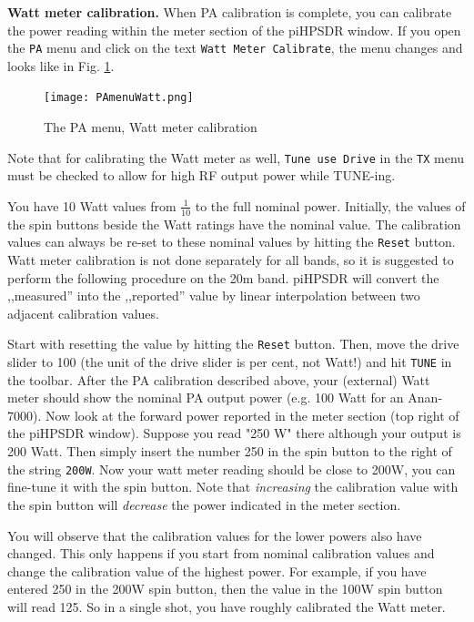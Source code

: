 \documentclass[12pt]{book}
\def\rett#1{\texttt{\color{red}#1}}
\def\bltt#1{\texttt{\color{blue}#1}}
\def\pH{pi\-HPSDR\xspace}
\begin{document}
\textbf{Watt meter calibration.} When PA calibration is complete,
you can calibrate the power reading within the meter section of
the \pH window. If you open the \bltt{PA} menu and click
on the text \rett{Watt Meter Calibrate}, the menu changes
and looks like in Fig. \ref{fig:PAMenuWatt}.

\begin{figure}[ht]
\center
\texttt{[image: PAmenuWatt.png]}
\caption{The PA menu, Watt meter calibration}
\label{fig:PAMenuWatt}
\end{figure}
Note that for calibrating the Watt meter as well,
\rett{Tune use Drive} in the \bltt{TX} menu must be checked
to allow for high RF output
power while TUNE-ing.

You have 10 Watt values from $\frac{1}{10}$ to the full nominal power. Initially,
the values of the spin buttons beside the Watt ratings have the nominal value.
The calibration values can always be re-set to these nominal values by hitting
the \rett{Reset} button. Watt meter calibration is not done separately for all
bands, so it is suggested to perform the following procedure on the 20m band.
\pH will convert the ,,measured'' into the ,,reported'' value by linear
interpolation between two adjacent calibration values.

Start with resetting the value by hitting the \rett{Reset} button. Then, move the
drive slider to 100 (the unit of the drive slider is per cent, not Watt!) and hit
\texttt{TUNE} in the toolbar.
After the PA calibration described above, your (external) Watt meter should
show the nominal PA output power (e.g. 100 Watt for an Anan-7000). Now look at the
forward power reported in the meter section (top right of the \pH window).
Suppose you read "250 W" there although your output is 200 Watt. Then simply
insert the number 250 in the spin button to the right of the string
\rett{200W}. Now your watt meter reading should be close to 200W, you can fine-tune
it with the spin button. Note that \textit{increasing} the calibration value
with the spin button will \textit{decrease} the power indicated in the meter section.

You will observe that the calibration values for the lower powers also have changed.
This only happens if you start from nominal calibration values and change the
calibration value of the highest power. For example, if you have entered 250 in
the 200W spin button, then the value in the 100W spin button will read 125. So in a
single shot, you have roughly calibrated the Watt meter.
\end{document}
